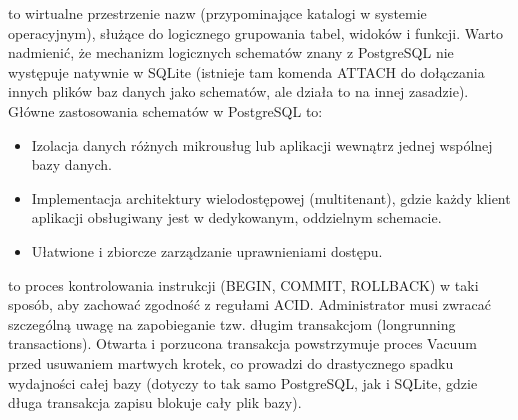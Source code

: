 \documentclass[letterpaper,10pt,polish]{sphinxmanual}
\begin{document}
\sphinxAtStartPar
{} to wirtualne przestrzenie nazw (przypominające katalogi w systemie operacyjnym), służące do logicznego grupowania tabel, widoków i funkcji. Warto nadmienić, że mechanizm logicznych schematów znany z PostgreSQL nie występuje natywnie w SQLite (istnieje tam komenda ATTACH do dołączania innych plików baz danych jako schematów, ale działa to na innej zasadzie). Główne zastosowania schematów w PostgreSQL to:
\begin{itemize}
\item {} 
\sphinxAtStartPar
Izolacja danych różnych mikrousług lub aplikacji wewnątrz jednej wspólnej bazy danych.

\item {} 
\sphinxAtStartPar
Implementacja architektury wielodostępowej (multi\sphinxhyphen{}tenant), gdzie każdy klient aplikacji obsługiwany jest w dedykowanym, oddzielnym schemacie.

\item {} 
\sphinxAtStartPar
Ułatwione i zbiorcze zarządzanie uprawnieniami dostępu.

\end{itemize}

\sphinxAtStartPar
{} to proces kontrolowania instrukcji (BEGIN, COMMIT, ROLLBACK) w taki sposób, aby zachować zgodność z regułami ACID. Administrator musi zwracać szczególną uwagę na zapobieganie tzw. długim transakcjom (long\sphinxhyphen{}running transactions). Otwarta i porzucona transakcja powstrzymuje proces Vacuum przed usuwaniem martwych krotek, co prowadzi do drastycznego spadku wydajności całej bazy (dotyczy to tak samo PostgreSQL, jak i SQLite, gdzie długa transakcja zapisu blokuje cały plik bazy).

\begin{sphinxVerbatim}[commandchars=\\\{\}]
\end{sphinxVerbatim}
\end{document}
